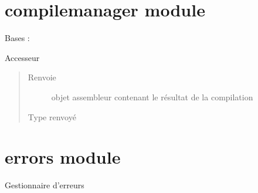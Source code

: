 \documentclass[letterpaper,10pt,french]{sphinxmanual}
\begin{document}
\section{compilemanager module}
\label{\detokenize{compilemanager:module-compilemanager}}\label{\detokenize{compilemanager:compilemanager-module}}\label{\detokenize{compilemanager::doc}}\label{\detokenize{compilemanager:module-compilemanager}}

\begin{fulllineitems}
\label{\detokenize{compilemanager:compilemanager.CompilationManager}}
Bases : 

\begin{fulllineitems}
\label{\detokenize{compilemanager:compilemanager.CompilationManager.asm}}
Accesseur
\begin{quote}\begin{description}
\item[{Renvoie}] \leavevmode
objet assembleur contenant le résultat de la compilation

\item[{Type renvoyé}] \leavevmode
{\hyperref[\detokenize{assembleurcontainer:assembleurcontainer.AssembleurContainer}]{}}

\end{description}\end{quote}

\end{fulllineitems}


\end{fulllineitems}



\section{errors module}
\label{\detokenize{errors:module-errors}}\label{\detokenize{errors:errors-module}}\label{\detokenize{errors::doc}}
Gestionnaire d’erreurs
\end{document}
